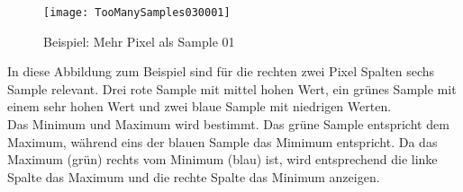 \begin{figure}[ht]
	\centering
	\texttt{[image: TooManySamples030001]}
	\caption{Beispiel: Mehr Pixel als Sample 01}
	\label{fig:gauge4}
\end{figure}
In diese Abbildung zum Beispiel sind für die rechten zwei Pixel Spalten sechs Sample relevant. Drei rote Sample mit mittel hohen Wert, ein grünes Sample mit einem sehr hohen Wert und zwei blaue Sample mit niedrigen Werten.\\
Das Minimum und Maximum wird bestimmt. Das grüne Sample entspricht dem Maximum, während eins der blauen Sample das Mimimum entspricht. Da das Maximum (grün) rechts vom Minimum (blau) ist, wird entsprechend die linke Spalte das Maximum und die rechte Spalte das Minimum anzeigen.\\